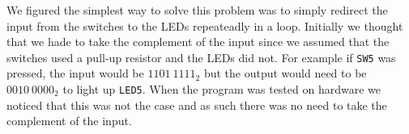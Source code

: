 We figured the simplest way to solve this problem was to simply redirect the input from the switches to the LEDs repeateadly in a loop. Initially we thought that we hade to take the complement of the input since we assumed that the switches used a pull-up resistor and the LEDs did not. For example if \texttt{SW5} was pressed, the input would be ${1101\ 1111}_2$ but the output would need to be ${0010\ 0000}_2$ to light up \texttt{LED5}. When the program was tested on hardware we noticed that this was not the case and as such there was no need to take the complement of the input.
